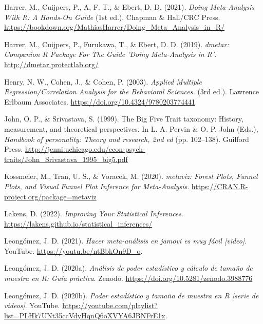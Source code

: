 \documentclass[
  bookmarksnumbered]{article}
\newlength{\cslhangindent}
\newlength{\cslentryspacingunit} %
\newenvironment{CSLReferences}[2] %
 {%
  \setlength{\parindent}{0pt}
  \ifodd #1
  \let\oldpar\par
  \def\par{\hangindent=\cslhangindent\oldpar}
  \fi
  \setlength{\parskip}{#2\cslentryspacingunit}
 }%
 {}
\begin{document}
\begin{CSLReferences}{1}{0}
\leavevmode{}%
Harrer, M., Cuijpers, P., A, F. T., \& Ebert, D. D. (2021). \emph{{Doing Meta-Analysis With {R}: A Hands-On Guide}} (1st ed.). Chapman \& Hall/CRC Press. \url{https://bookdown.org/MathiasHarrer/Doing_Meta_Analysis_in_R/}

\leavevmode{}%
Harrer, M., Cuijpers, P., Furukawa, T., \& Ebert, D. D. (2019). \emph{{dmetar: Companion R Package For The Guide 'Doing Meta-Analysis in R'}}. \url{http://dmetar.protectlab.org/}

\leavevmode{}%
Henry, N. W., Cohen, J., \& Cohen, P. (2003). \emph{Applied {Multiple Regression}/{Correlation Analysis} for the {Behavioral Sciences}.} (3rd ed.). {Lawrence Erlbaum Associates}. \url{https://doi.org/10.4324/9780203774441}

\leavevmode{}%
John, O. P., \& Srivastava, S. (1999). The {Big Five Trait} taxonomy: {History}, measurement, and theoretical perspectives. In L. A. Pervin \& O. P. John (Eds.), \emph{Handbook of personality: {Theory} and research, 2nd ed} (pp. 102--138). {Guilford Press}. \url{http://jenni.uchicago.edu/econ-psych-traits/John_Srivastava_1995_big5.pdf}

\leavevmode{}%
Kossmeier, M., Tran, U. S., \& Voracek, M. (2020). \emph{{metaviz: Forest Plots, Funnel Plots, and Visual Funnel Plot Inference for Meta-Analysis}}. \url{https://CRAN.R-project.org/package=metaviz}

\leavevmode{}%
Lakens, D. (2022). \emph{Improving {Your Statistical Inferences}}. \url{https://lakens.github.io/statistical_inferences/}

\leavevmode{}%
Leongómez, J. D. (2021). \emph{Hacer meta-análisis en jamovi es muy fácil \emph{{[}video{]}}}. YouTube. \url{https://youtu.be/ntBbkOn9D_o}.

\leavevmode{}%
Leongómez, J. D. (2020a). \emph{Análisis de poder estadístico y cálculo de tamaño de muestra en {R}: {Guía} práctica}. {Zenodo}. \url{https://doi.org/10.5281/zenodo.3988776}

\leavevmode{}%
Leongómez, J. D. (2020b). \emph{Poder estadístico y tamaño de muestra en {R} \emph{{[}serie de videos{]}}}. YouTube. \url{https://youtube.com/playlist?list=PLHk7UNt35ccVdyHqnQ6oXVYA6JBNFrE1x}.


\end{CSLReferences}
\end{document}
